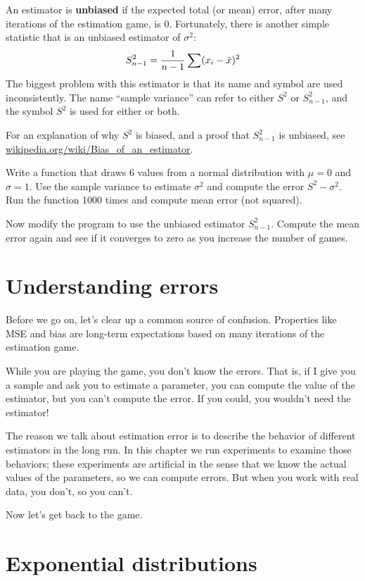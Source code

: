 \documentclass[12pt]{book}
\begin{document}
An estimator is {\bf unbiased} if the expected total (or mean) error,
after many iterations of the estimation game, is 0.
Fortunately, there is another simple statistic that is an unbiased
estimator of $\sigma^2$:
%
\[ S_{n-1}^2 = \frac{1}{n-1} \sum (x_i - \bar{x})^2 \] 
%
The biggest problem with this estimator is that its name and symbol
are used inconsistently.  The name ``sample variance'' can refer to
either $S^2$ or $S_{n-1}^2$, and the symbol $S^2$ is used
for either or both.

For an explanation of why $S^2$ is biased, and a proof that
$S_{n-1}^2$ is unbiased, see
\url{wikipedia.org/wiki/Bias_of_an_estimator}.

\begin{ex}

Write a function that draws 6 values from a normal distribution with
$\mu=0$ and $\sigma=1$.  Use the sample variance to estimate
$\sigma^2$ and compute the error $S^2 - \sigma^2$.  Run the function 1000
times and compute mean error (not squared).

Now modify the program to use the unbiased estimator $S_{n-1}^2$.
Compute the mean error again and see if it converges to zero as you
increase the number of games.

\end{ex}


\section{Understanding errors}

Before we go on, let's clear up a common source of confusion.
Properties like MSE and bias are long-term expectations based on
many iterations of the estimation game.

While you are playing the game, you don't know the errors.  That is,
if I give you a sample and ask you to estimate a parameter, you
can compute the value of the estimator, but you can't compute the
error.  If you could, you wouldn't need the estimator!

The reason we talk about estimation error is to describe the behavior
of different estimators in the long run.  In this chapter we run
experiments to examine those behaviors; these experiments are
artificial in the sense that we know the actual values of the
parameters, so we can compute errors.  But when you work with
real data, you don't, so you can't.

Now let's get back to the game.


\section{Exponential distributions}
\end{document}

